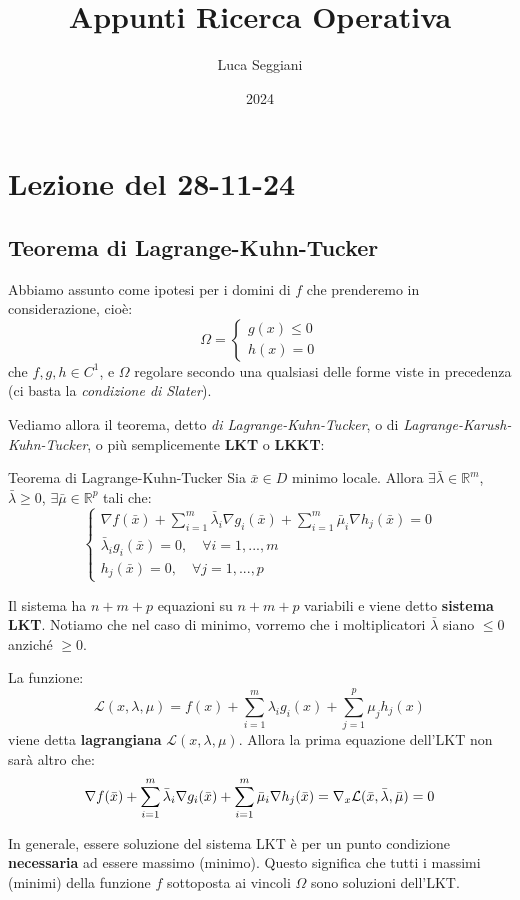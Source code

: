 \documentclass[a4paper,11pt]{article}
\title{Appunti Ricerca Operativa}
\author{Luca Seggiani}
\date{2024}
\begin{document}
\section{Lezione del 28-11-24}

\thispagestyle{empty}
\pagestyle{fancy}

\subsection{Teorema di Lagrange-Kuhn-Tucker}
Abbiamo assunto come ipotesi per i domini di $f$ che prenderemo in considerazione, cioè:
$$
\Omega = 
	\begin{cases}
		g(x) \leq 0 \\ 
		h(x) = 0
	\end{cases}
$$
che $f, g, h \in C^1$, e $\Omega$ regolare secondo una qualsiasi delle forme viste in precedenza (ci basta la \textit{condizione di Slater}).

Vediamo allora il teorema, detto \textit{di Lagrange-Kuhn-Tucker}, o di \textit{Lagrange-Karush-Kuhn-Tucker}, o più semplicemente \textbf{LKT} o \textbf{LKKT}:
\begin{theorem}{Teorema di Lagrange-Kuhn-Tucker}
	Sia $\bar{x} \in D$ minimo locale.
	Allora $\exists \bar{\lambda} \in \mathbb{R}^m$, $\bar{\lambda} \geq 0$, $\exists \bar{\mu} \in \mathbb{R}^p$ tali che:
	\[
		\begin{cases}
			\nabla f(\bar{x}) + \sum\limits_{i=1}^m \bar{\lambda}_i \nabla g_i(\bar{x}) + \sum\limits_{i=1}^m \bar{\mu}_i \nabla h_j(\bar{x}) = 0 \\ 
			\bar{\lambda}_i g_i(\bar{x}) = 0, \quad \forall i = 1, ..., m \\ 
			h_j(\bar{x}) = 0, \quad \forall j = 1, ..., p	
		\end{cases}
	\]
\end{theorem}
Il sistema ha $n + m + p$ equazioni su $n + m + p$ variabili e viene detto \textbf{sistema LKT}.
Notiamo che nel caso di minimo, vorremo che i moltiplicatori $\bar{\lambda}$ siano $\leq 0$ anziché $\geq 0$.

La funzione:
$$
\mathcal{L}(x, \lambda, \mu) = f(x) + \sum\limits_{i=1}^m \lambda_i g_i(x) + \sum\limits_{j=1}^p \mu_j h_j(x)
$$
viene detta \textbf{lagrangiana} $\mathcal{L}(x, \lambda, \mu)$.
Allora la prima equazione dell'LKT non sarà altro che:
$$
\nabla f(\bar{x}) + \sum\limits_{i=1}^m \bar{\lambda}_i \nabla g_i(\bar{x}) + \sum\limits_{i=1}^m \bar{\mu}_i \nabla h_j(\bar{x}) = \nabla_x \mathcal{L}(\bar{x}, \bar{\lambda}, \bar{\mu}) = 0 \\ 
$$

In generale, essere soluzione del sistema LKT è per un punto condizione \textbf{necessaria} ad essere massimo (minimo).
Questo significa che tutti i massimi (minimi) della funzione $f$ sottoposta ai vincoli $\Omega$ sono soluzioni dell'LKT.
\end{document}
